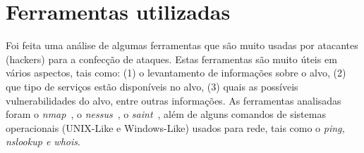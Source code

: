 \documentclass[brazil]{abnt}
\begin{document}
\chapter{Ferramentas utilizadas}

Foi feita uma análise de algumas ferramentas que são muito usadas
por atacantes (hackers) para a confecção de ataques. Estas ferramentas
são muito úteis em vários aspectos, tais como: (1) o levantamento
de informações sobre o alvo, (2) que tipo de serviços estão disponíveis
no alvo, (3) quais as possíveis vulnerabilidades do alvo, entre outras
informações. As ferramentas analisadas foram o \emph{nmap}~,
o \emph{nessus}~, o \emph{saint}~, além
de alguns comandos de sistemas operacionais (UNIX-Like e Windows-Like)
usados para rede, tais como o \emph{ping, nslookup e whois}. 
\end{document}
